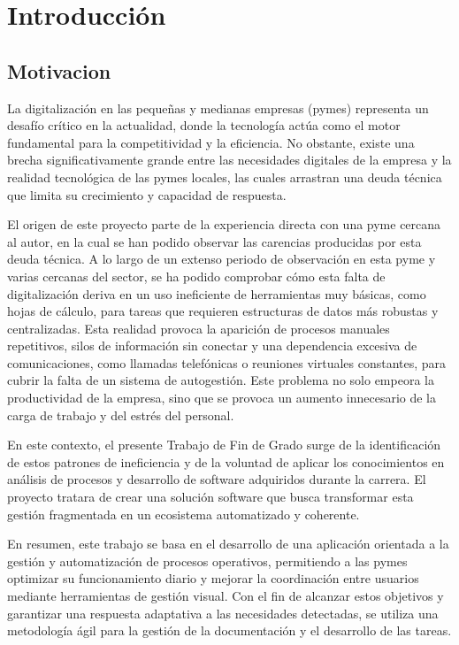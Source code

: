 \chapter{Introducción}
\section{Motivacion}
La digitalización en las pequeñas y medianas empresas (pymes) representa un desafío crítico en la actualidad, donde la tecnología actúa como el motor fundamental para la competitividad y la eficiencia. No obstante, existe una brecha significativamente grande entre las necesidades digitales de la empresa y la realidad tecnológica de las pymes locales, las cuales arrastran una deuda técnica que limita su crecimiento y capacidad de respuesta.

El origen de este proyecto parte de la experiencia directa con una pyme cercana al autor, en la cual se han podido observar las carencias producidas por esta deuda técnica. A lo largo de un extenso periodo de observación en esta pyme y varias cercanas del sector, se ha podido comprobar cómo esta falta de digitalización deriva en un uso ineficiente de herramientas muy básicas, como hojas de cálculo, para tareas que requieren estructuras de datos más robustas y centralizadas. Esta realidad provoca la aparición de procesos manuales repetitivos, silos de información sin conectar y una dependencia excesiva de comunicaciones, como llamadas telefónicas o reuniones virtuales constantes, para cubrir la falta de un sistema de autogestión. Este problema no solo empeora la productividad de la empresa, sino que se provoca un aumento innecesario de la carga de trabajo y del estrés del personal.

En este contexto, el presente Trabajo de Fin de Grado surge de la identificación de estos patrones de ineficiencia y de la voluntad de aplicar los conocimientos en análisis de procesos y desarrollo de software adquiridos durante la carrera. El proyecto tratara de crear una solución software que busca transformar esta gestión fragmentada en un ecosistema automatizado y coherente.

En resumen, este trabajo se basa en el desarrollo de una aplicación orientada a la gestión y automatización de procesos operativos, permitiendo a las pymes optimizar su funcionamiento diario y mejorar la coordinación entre usuarios mediante herramientas de gestión visual.  Con el fin de alcanzar estos objetivos y garantizar una respuesta adaptativa a las necesidades detectadas, se utiliza una metodología ágil para la gestión de la documentación y el desarrollo de las tareas.
